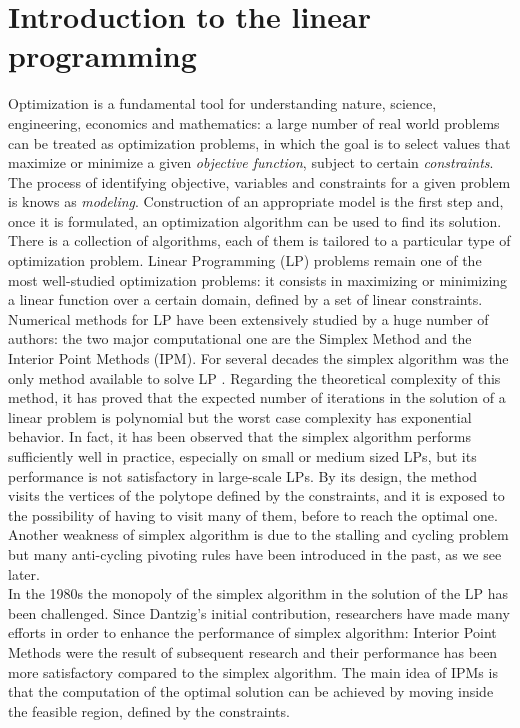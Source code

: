 \documentclass[a4paper,10 pt,titlepage,twoside]{book}
\theoremstyle{plain}
\theoremstyle{definition}
\theoremstyle{remark}
\begin{document}
\chapter{Introduction to the linear programming}
Optimization is a fundamental tool for understanding nature, science, engineering, economics and mathematics: a large number of real world problems can be treated as optimization problems, in which the goal is to select values that maximize or minimize a given \textit{objective function}, subject to certain \textit{constraints}.\\ The process of identifying objective, variables and constraints for a given problem is knows as \textit{modeling}. Construction of an appropriate model is the first step and, once it is formulated, an optimization algorithm can be used to find its solution.\\ There is a collection of algorithms, each of them is tailored to a particular type of optimization problem. Linear Programming (LP) problems remain one of the most well-studied optimization problems: it consists in maximizing or minimizing a linear function over a certain domain, defined by a set of linear constraints.\\
Numerical methods for LP have been extensively studied by a huge number of authors: the two major computational one are the Simplex Method and the Interior Point Methods (IPM).
For several decades the simplex algorithm was the only method available to solve LP \cite{1}. Regarding the theoretical complexity of this method, it has proved that the expected number of iterations in the solution of a linear problem is polynomial but the worst case complexity has exponential behavior. In fact, it has been observed that the simplex algorithm performs sufficiently well in practice, especially on small or medium sized LPs, but its performance is not satisfactory in large-scale LPs. By its design, the method visits the vertices of the polytope defined by the constraints, and it is exposed to the possibility of having to visit many of them, before to reach the optimal one.\\ Another weakness of simplex algorithm is due to the stalling and cycling problem but many anti-cycling pivoting rules have been introduced in the past, as we see later.\\
In the 1980s the monopoly of the simplex algorithm in the solution of the LP has been challenged. Since Dantzig's initial contribution, researchers have made many efforts in order to enhance the performance of simplex algorithm: Interior Point Methods were the result of subsequent research and their performance has been more satisfactory compared to the simplex algorithm. The main idea of IPMs is that the computation of the optimal solution can be achieved by moving inside the feasible region, defined by the constraints.\\
\end{document}
